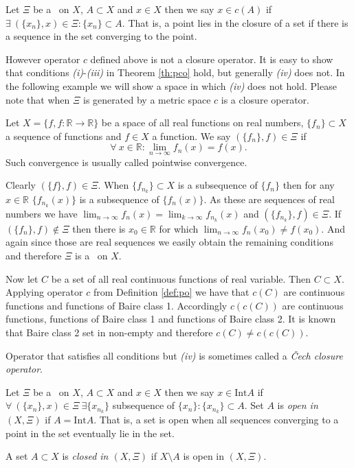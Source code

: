 \begin{define}\label{def:po}
Let $\Xi$ be a \fcs\ on $X$, $A\subset X$ and $x\in X$ then we say $x\in c(A)$ if $\exists\ (\{x_n\}, x)\in\Xi: \{x_n\}\subset A$. That is, a point lies in the closure of a set if there is a sequence in the set converging to the point.
\end{define}

However operator $c$ defined above is not a closure operator. It is easy to show that conditions \emph{(i)}-\emph{(iii)} in Theorem \ref{th:pco} hold, but generally \emph{(iv)} does not. In the following example we will show a space in which \emph{(iv)} does not hold. Please note that when $\Xi$ is generated by a metric space $c$ is a closure operator.

\begin{example}
	Let $X=\{f, f:\mathbb{R}\to \mathbb{R}\}$ be a space of all real functions on real numbers, $\{f_n\}\subset X$ a sequence of functions and $f\in X$ a function. We say $(\{f_n\}, f)\in\Xi$ if
\[
	\forall\ x\in \mathbb{R}: \lim_{n\to\infty}f_n(x)=f(x).
\]
Such convergence is usually called pointwise convergence.

Clearly $(\{f\},f)\in\Xi$. When $\{f_{n_k}\}\subset X$ is a subsequence of $\{f_n\}$ then for any $x\in \mathbb{R}$ $\{f_{n_k}(x)\}$ is a subsequence of $\{f_n(x)\}$. As these are sequences of real numbers we have $\lim_{n\to\infty}f_n(x)=\lim_{k\to\infty}f_{n_k}(x)$ and $(\{f_{n_k}\}, f)\in\Xi$. If $(\{f_n\}, f)\notin\Xi$ then there is $x_0\in \mathbb{R}$ for which $\lim_{n\to\infty}f_n(x_0)\ne f(x_0)$. And again since those are real sequences we easily obtain the remaining conditions and therefore $\Xi$ is a \fcs\ on $X$.

Now let $C$ be a set of all real continuous functions of real variable. Then $C\subset X$. Applying operator $c$ from Definition \ref{def:po} we have that $c(C)$ are continuous functions and functions of Baire class 1. Accordingly $c(c(C))$ are continuous functions, functions of Baire class 1 and functions of Baire class 2. It is known that Baire class 2 set in non-empty and therefore $c(C)\ne c(c(C))$.
\end{example}

Operator that satisfies all conditions but \emph{(iv)} is sometimes called a \emph{Čech closure operator}. 

\begin{define}\label{def:io}
Let $\Xi$ be a \fcs\ on $X$, $A\subset X$ and $x\in X$ then we say $x\in \mathrm{Int} A$ if $\forall\ (\{x_n\}, x)\in\Xi\ \exists \{x_{n_k}\}$ subsequence of $\{x_n\}: \{x_{n_k}\}\subset A$. Set $A$ is \emph{open in $(X,\Xi)$} if $A=\mathrm{Int} A$. That is, a set is open when all sequences converging to a point in the set eventually lie in the set.

A set $A\subset X$ is \emph{closed in $(X,\Xi)$} if $X\setminus A$ is open in $(X,\Xi)$.
\end{define}

